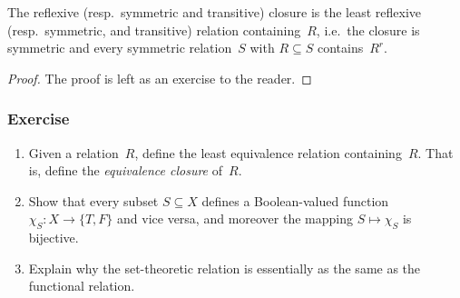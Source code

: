 \begin{proposition}
  The reflexive (resp.\ symmetric and transitive) closure is the least reflexive
  (resp.\ symmetric, and transitive) relation containing~$R$, i.e.\ the closure
  is symmetric and every symmetric relation~$S$ with $R \subseteq S$
  contains~$R^r$.
\end{proposition}
\begin{proof}
  The proof is left as an exercise to the reader.
\end{proof}

\subsubsection*{Exercise}
\begin{enumerate}
  \item Given a relation~$R$, define the least equivalence relation 
    containing~$R$. That is, define the \emph{equivalence closure} of~$R$.
  \item Show that every subset $S \subseteq X$ defines a Boolean-valued 
    function $\chi_S\colon X \to \{T, F\}$ and vice versa, and moreover the
    mapping $S \mapsto \chi_S$ is bijective. 
  \item Explain why the set-theoretic relation is essentially as the same as the
    functional relation. 
\end{enumerate}


 


